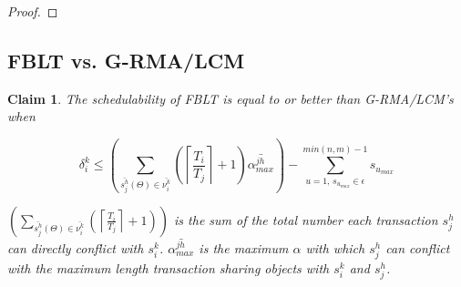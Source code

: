 \documentclass[prodmode,acmtecs]{acmsmall}
\newtheorem{clm}{Claim}
\begin{document}
\begin{compactenum}
\begin{proof}

\end{proof}

\subsection{FBLT vs. G-RMA/LCM}

\begin{clm}\label{clm:fblt_lcm_rma}
The schedulability of FBLT is equal to or better than G-RMA/LCM's when 

\[
\delta_i^k\le\left(\sum_{\bar{s_{j}^{h}}(\Theta)\in \bar{\nu_{i}^{k}}}\left(\left\lceil \frac{T_{i}}{T_{j}}\right\rceil +1\right)\bar{\alpha_{max}^{jh}}\right)-\sum_{u=1,\,s_{u_{max}}\in \epsilon}^{min(n,m)-1} s_{u_{max}}\label{eq:fblt_lcm_rma_comparison_7_mod}
\]

$\left(\sum_{\bar{s_{j}^{h}}(\Theta) \in \bar{\nu_{i}^{k}}}\left(\left\lceil \frac{T_{i}}{T_{j}}\right\rceil +1\right)\right)$ is the sum of the total number each transaction $s_j^h$ can directly conflict with $s_i^k$. $\bar{\alpha_{max}^{jh}}$ is the maximum $\alpha$ with which $s_j^h$ can conflict with the maximum length transaction sharing objects with $s_i^k$ and $s_j^h$. 


\end{clm}
\end{compactenum}
\end{document}
